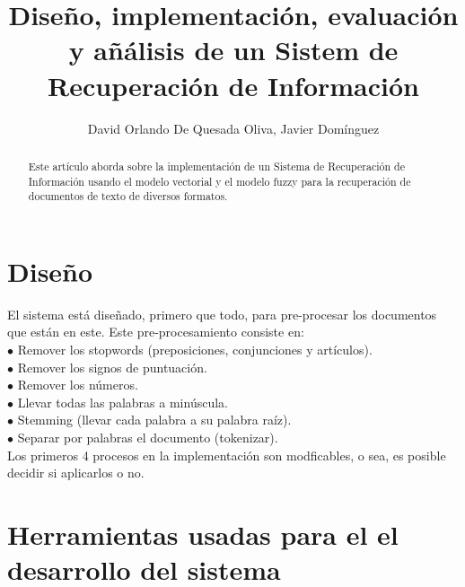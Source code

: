\documentclass{llncs}
\begin{document}
%
\title{Diseño, implementación, evaluación y añálisis de un Sistem de Recuperación de Información}
\author{David Orlando De Quesada Oliva, Javier Dom\'inguez}
\maketitle

\begin{abstract}
    
    Este art\'iculo aborda sobre la implementación de un Sistema de Recuperación de Información usando 
    el modelo vectorial y el modelo fuzzy para la recuperación de documentos de texto de diversos 
    formatos.

\end{abstract}

\tableofcontents
%


\chapter*{Dise\~no}
El sistema está diseñado, primero que todo, para pre-procesar los documentos que están en este.
Este pre-procesamiento consiste en: \\

\noindent $\bullet$ Remover los stopwords (preposiciones, conjunciones y artículos). \\
$\bullet$ Remover los signos de puntuación.\\
$\bullet$ Remover los números.\\
$\bullet$ Llevar todas las palabras a minúscula.\\
$\bullet$ Stemming (llevar cada palabra a su palabra raíz).\\
$\bullet$ Separar por palabras el documento (tokenizar).\\

Los primeros 4 procesos en la implementación son modficables, o sea, es posible decidir si aplicarlos o no.\\

\chapter*{Herramientas usadas para el el desarrollo del sistema}
\end{document}
